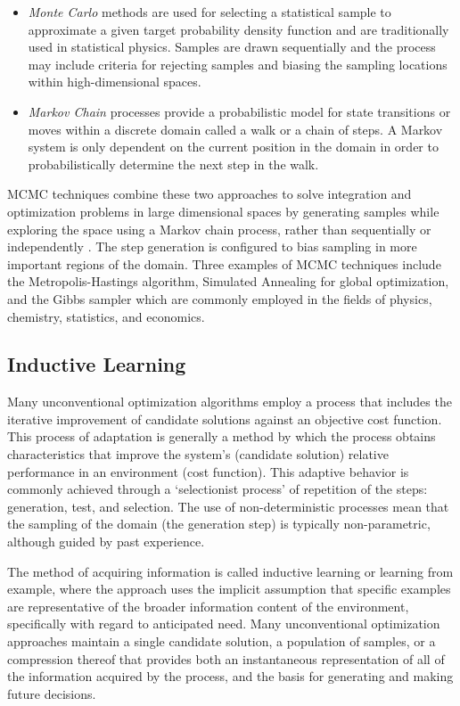 \begin{bibunit}
\begin{itemize}
	\item \emph{Monte Carlo} methods are used for selecting a statistical sample to approximate a given target probability density function and are traditionally used in statistical physics. Samples are drawn sequentially and the process may include criteria for rejecting samples and biasing the sampling locations within high-dimensional spaces. 
	\item \emph{Markov Chain} processes provide a probabilistic model for state transitions or moves within a discrete domain called a walk or a chain of steps. A Markov system is only dependent on the current position in the domain in order to probabilistically determine the next step in the walk.
\end{itemize}

MCMC techniques combine these two approaches to solve integration and optimization problems in large dimensional spaces by generating samples while exploring the space using a Markov chain process, rather than sequentially or independently \cite{Andrieu2003}. The step generation is configured to bias sampling in more important regions of the domain. Three examples of MCMC techniques include the Metropolis-Hastings algorithm, Simulated Annealing for global optimization, and the Gibbs sampler which are commonly employed in the fields of physics, chemistry, statistics, and economics. 

% 
% 
\subsection{Inductive Learning}
\label{subsec:induction}
Many unconventional optimization algorithms employ a process that includes the iterative improvement of candidate solutions against an objective cost function. This process of adaptation is generally a method by which the process obtains characteristics that improve the system's (candidate solution) relative performance in an environment (cost function). This adaptive behavior is commonly achieved through a `selectionist process' of repetition of the steps: generation, test, and selection. The use of non-deterministic processes mean that the sampling of the domain (the generation step) is typically non-parametric, although guided by past experience. 

The method of acquiring information is called inductive learning or learning from example, where the approach uses the implicit assumption that specific examples are representative of the broader information content of the environment, specifically with regard to anticipated need. Many unconventional optimization approaches maintain a single candidate solution, a population of samples, or a compression thereof that provides both an instantaneous representation of all of the information acquired by the process, and the basis for generating and making future decisions. 


\end{bibunit}
